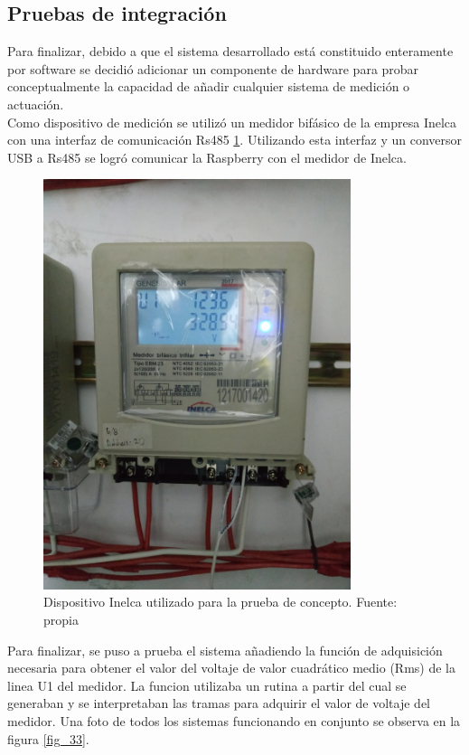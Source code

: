 \subsection{Pruebas de integración}

Para finalizar, debido a que el sistema desarrollado está constituido enteramente por software se decidió adicionar un componente de hardware para probar conceptualmente la capacidad de añadir cualquier sistema de medición o actuación.
\vspace{0.5cm}\\
Como dispositivo de medición se utilizó un medidor bifásico de la empresa Inelca con una interfaz de comunicación Rs485 \ref{fig_32}. Utilizando esta interfaz y un conversor USB a Rs485 se logró comunicar la Raspberry con el medidor de Inelca.
\vspace{0.5cm}\\
\begin{figure}[htbp]
	\centerline{\includegraphics[width=9cm]{./figuras/concepto_1.png}}
	\caption{Dispositivo Inelca utilizado para la prueba de concepto. Fuente: propia}
	\label{fig_32}
\end{figure}

Para finalizar, se puso a prueba el sistema añadiendo la función de adquisición necesaria para obtener el valor del voltaje de valor cuadrático medio (Rms) de la linea U1 del medidor. La funcion utilizaba un rutina a partir del cual se generaban y se interpretaban las tramas para adquirir el valor de voltaje del medidor. Una foto de todos los sistemas funcionando en conjunto se observa en la figura \ref{fig_33}.

